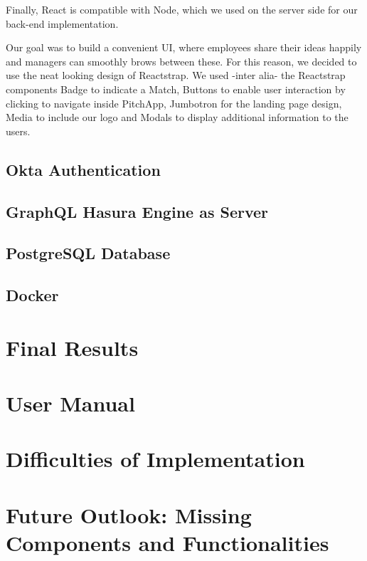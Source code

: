 Finally, React is compatible with Node, which we used on the server side for our back-end implementation.

Our goal was to build a convenient UI, where employees share their ideas happily and managers can smoothly brows between these. For this reason, we decided to use the neat looking design of Reactstrap. We used -inter alia- the Reactstrap components Badge to indicate a Match, Buttons to enable user interaction by clicking to navigate inside PitchApp, Jumbotron for the landing page design, Media to include our logo and Modals to display additional information to the users.

\section{Okta Authentication}
\section{GraphQL Hasura Engine as Server}
\section{PostgreSQL Database}
\section{Docker}
\chapter{Final Results}
\chapter{User Manual}
\chapter{Difficulties of Implementation}
\chapter{Future Outlook: Missing Components and Functionalities}



